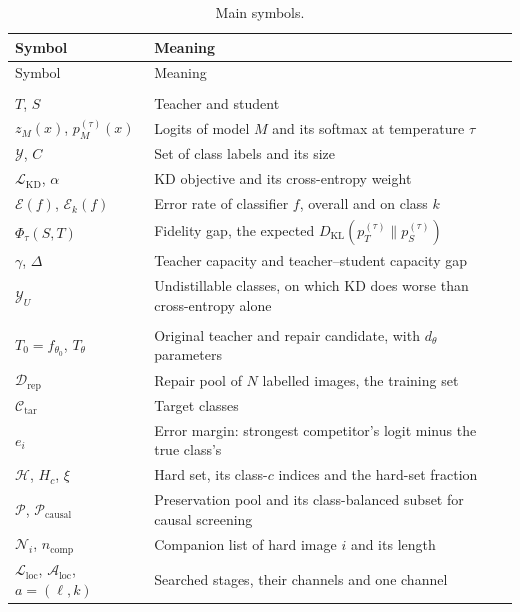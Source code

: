 \documentclass[review,number,sort&compress]{elsarticle}
\theoremstyle{definition}
\begin{document}
{\footnotesize
\setlength{\tabcolsep}{3pt}
\begin{longtable}{@{}>{\raggedright\arraybackslash}p{}%
>{\raggedright\arraybackslash}p{}@{}}
\caption{Main symbols.}\label{tab:notation}\\
\toprule
Symbol & Meaning \\
\midrule
\endfirsthead
\toprule
Symbol & Meaning \\
\midrule
\endhead
\bottomrule
\endfoot
\multicolumn{2}{@{}l}{\textit{Distillation (Section~\ref{sec:introduction})}} \\
$T$, $S$ & Teacher and student \\
$z_M(x)$, $p_M^{(\tau)}(x)$ & Logits of model $M$ and its softmax at temperature $\tau$ \\
$\mathcal Y$, $C$ & Set of class labels and its size \\
$\mathcal L_{\mathrm{KD}}$, $\alpha$ & KD objective and its cross-entropy weight \\
$\mathcal E(f)$, $\mathcal E_k(f)$ & Error rate of classifier $f$, overall and on class $k$ \\
$\Phi_\tau(S,T)$ & Fidelity gap, the expected $D_{\mathrm{KL}}(p_T^{(\tau)}\|p_S^{(\tau)})$ \\
$\gamma$, $\Delta$ & Teacher capacity and teacher--student capacity gap \\
$\mathcal Y_U$ & Undistillable classes, on which KD does worse than cross-entropy alone \\
\midrule
\multicolumn{2}{@{}l}{\textit{Repair (Section~\ref{sec:repair})}} \\
$T_0=f_{\theta_0}$, $T_\theta$ & Original teacher and repair candidate, with $d_\theta$ parameters \\
$\mathcal D_{\mathrm{rep}}$ & Repair pool of $N$ labelled images, the training set \\
$\mathcal C_{\mathrm{tar}}$ & Target classes \\
$e_i$ & Error margin: strongest competitor's logit minus the true class's \\
$\mathcal H$, $H_c$, $\xi$ & Hard set, its class-$c$ indices and the hard-set fraction \\
$\mathcal P$, $\mathcal P_{\mathrm{causal}}$ & Preservation pool and its class-balanced subset for causal screening \\
$\mathcal N_i$, $n_{\mathrm{comp}}$ & Companion list of hard image $i$ and its length \\
$\mathcal L_{\mathrm{loc}}$, $\mathcal A_{\mathrm{loc}}$, $a=(\ell,k)$ & Searched stages, their channels and one channel \\

\end{longtable}}
\end{document}
